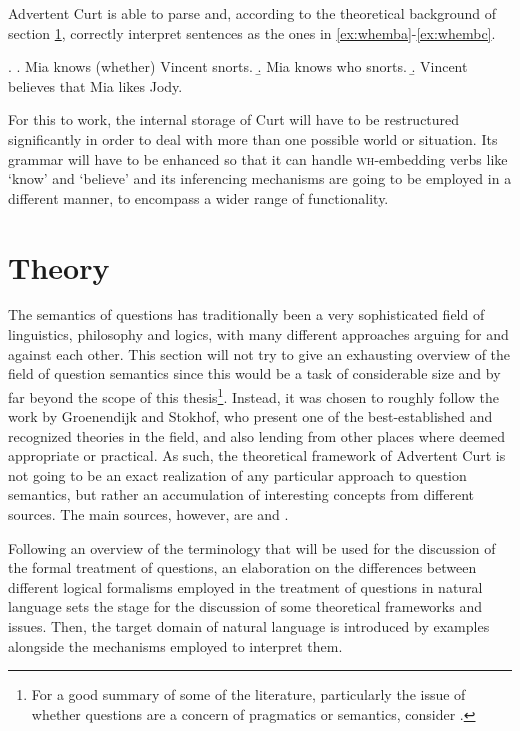 \documentclass[a4paper]{article}
\newcommand{\pn}{\textsf} %
\newcommand{\wh}{\textsc{wh}}
\newcommand{\curt}{\pn{Curt}}
\newcommand{\acurt}{\pn{Advertent Curt}}
\theoremstyle{remark}
\theoremstyle{remark}
\theoremstyle{definition}
\theoremstyle{definition}
\begin{document}
\acurt{} is able to parse and, according to the theoretical background of section
\ref{sec:theory}, correctly interpret sentences as the ones in
\ref{ex:whemba}-\ref{ex:whembc}.

\ex.
\a.  Mia knows (whether) Vincent snorts.\label{ex:whemba}
\b.  Mia knows who snorts.
\b.  Vincent believes that Mia likes Jody.\label{ex:whembc}

For this to work, the internal storage of \curt{} will have to be restructured
significantly in order to deal with more than one possible world or situation.
Its grammar will have to be enhanced so that it can handle \wh-embedding verbs
like `know' and `believe' and its inferencing mechanisms are going to be
employed in a different manner, to encompass a wider range of functionality.

\section{Theory}\label{sec:theory}

The semantics of questions has traditionally been a very sophisticated field of
linguistics,  philosophy and logics, with many different approaches arguing for
and against each other. This section will not try to give an exhausting overview
of the field of question semantics since this would be a task of considerable
size and by far beyond the scope of this thesis\footnote{For a good summary of
some of the literature, particularly the issue of whether questions are a
concern of pragmatics or semantics, consider \cite[section 2 and 3]{gs:q}.}.
Instead, it was chosen to roughly follow the work by Groenendijk and Stokhof,
who present one of the best-established and recognized theories in the field,
and also lending from other places where deemed appropriate or practical. As
such, the theoretical framework of \acurt{} is not going to be an exact
realization of any particular approach to question semantics, but rather an
accumulation of interesting concepts from different sources. The main sources,
however, are \cite{gs:q} and \cite{gs:sqpa}.

Following an overview of the terminology that will be used for the discussion of
the formal treatment of questions, an  elaboration on the differences between
different logical formalisms employed in the treatment of questions in natural
language sets the stage for the discussion of some theoretical frameworks and
issues. Then, the target domain of natural language is introduced by examples
alongside the mechanisms employed to interpret them. 
\end{document}
